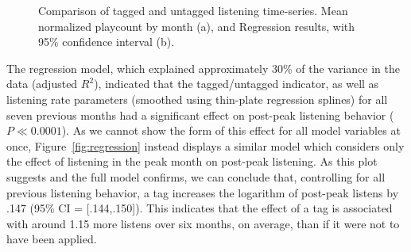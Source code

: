   \begin{figure}[t]
    \hfill
    \caption{Comparison of tagged and untagged listening time-series. Mean normalized playcount by month (a), and Regression results, with 95\% confidence interval (b).}
    \label{fig:regressionFigs}
    \vspace{-2em}
  \end{figure}

The regression model, which explained approximately 30\% of the variance in the data (adjusted $R^{2}$), indicated that the tagged/untagged indicator, as well as listening rate parameters (smoothed using thin-plate regression splines) for all seven previous months had a significant effect on post-peak listening behavior ($P \ll 0.0001$). As we cannot show the form of this effect for all model variables at once, Figure~\ref{fig:regression} instead displays a similar model which considers only the effect of listening in the peak month on post-peak listening. As this plot suggests and the full model confirms, we can conclude that, controlling for all previous listening behavior, a tag increases the logarithm of post-peak listens by .147 (95\% CI = [.144,.150]). This indicates that the effect of a tag is associated with around 1.15 more listens over six months, on average, than if it were not to have been applied.   

